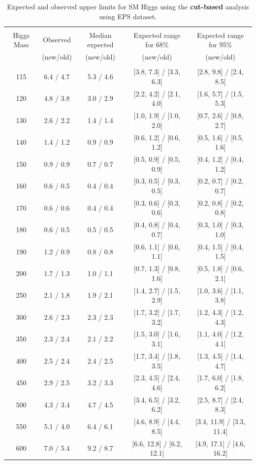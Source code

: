 \begin{table}[hbp!]
\begin{center}
\begin{tabular}{c c c c c}
\hline
\vspace{-3mm} && \\
 Higgs Mass   & Observed & Median expected & Expected range for 68\% & Expected range for 95\%   \\
    & (new/old) & (new/old) & (new/old) & (new/old)   \\
\vspace{-3mm} && \\
\hline
115 & 6.4 / 4.7 & 5.3 / 4.6 & [3.8, 7.3] / [3.3, 6.3] & [2.8, 9.8] / [2.4, 8.5] \\
120 & 4.8 / 3.8 & 3.0 / 2.9 & [2.2, 4.2] / [2.1, 4.0] & [1.6, 5.7] / [1.5, 5.3] \\
130 & 2.6 / 2.2 & 1.4 / 1.4 & [1.0, 1.9] / [1.0, 2.0] & [0.7, 2.6] / [0.8, 2.7] \\
140 & 1.4 / 1.2 & 0.9 / 0.9 & [0.6, 1.2] / [0.6, 1.2] & [0.5, 1.6] / [0.5, 1.6] \\
150 & 0.9 / 0.9 & 0.7 / 0.7 & [0.5, 0.9] / [0.5, 0.9] & [0.4, 1.2] / [0.4, 1.2] \\
160 & 0.6 / 0.5 & 0.4 / 0.4 & [0.3, 0.5] / [0.3, 0.5] & [0.2, 0.7] / [0.2, 0.7] \\
170 & 0.6 / 0.6 & 0.4 / 0.4 & [0.3, 0.6] / [0.3, 0.6] & [0.2, 0.8] / [0.2, 0.8] \\
180 & 0.6 / 0.5 & 0.5 / 0.5 & [0.4, 0.8] / [0.4, 0.7] & [0.3, 1.0] / [0.3, 1.0] \\
190 & 1.2 / 0.9 & 0.8 / 0.8 & [0.6, 1.1] / [0.6, 1.1] & [0.4, 1.5] / [0.4, 1.5] \\
200 & 1.7 / 1.3 & 1.0 / 1.1 & [0.7, 1.3] / [0.8, 1.6] & [0.5, 1.8] / [0.6, 2.1] \\
250 & 2.1 / 1.8 & 1.9 / 2.1 & [1.4, 2.7] / [1.5, 2.9] & [1.0, 3.6] / [1.1, 3.8] \\
300 & 2.6 / 2.3 & 2.3 / 2.3 & [1.7, 3.2] / [1.7, 3.2] & [1.2, 4.3] / [1.2, 4.3] \\
350 & 2.3 / 2.4 & 2.1 / 2.2 & [1.5, 3.0] / [1.6, 3.1] & [1.1, 4.0] / [1.2, 4.1] \\
400 & 2.5 / 2.4 & 2.4 / 2.5 & [1.7, 3.4] / [1.8, 3.5] & [1.3, 4.5] / [1.4, 4.7] \\
450 & 2.9 / 2.5 & 3.2 / 3.3 & [2.3, 4.5] / [2.4, 4.6] & [1.7, 6.0] / [1.8, 6.2] \\
500 & 4.3 / 3.4 & 4.7 / 4.5 & [3.4, 6.5] / [3.2, 6.2] & [2.5, 8.7] / [2.4, 8.3] \\
550 & 5.1 / 4.0 & 6.4 / 6.1 & [4.6, 8.9] / [4.4, 8.5] & [3.4, 11.9] / [3.3, 11.4] \\
600 & 7.0 / 5.4 & 9.2 / 8.7 & [6.6, 12.8] / [6.2, 12.1] & [4.9, 17.1] / [4.6, 16.2] \\

\hline
\end{tabular}
\caption{Expected and observed upper limits for SM Higgs using the
  {\bf cut-based} analysis using EPS dataset.}
\label{tab:cutbase_uls_eps}
\end{center}
\end{table}

